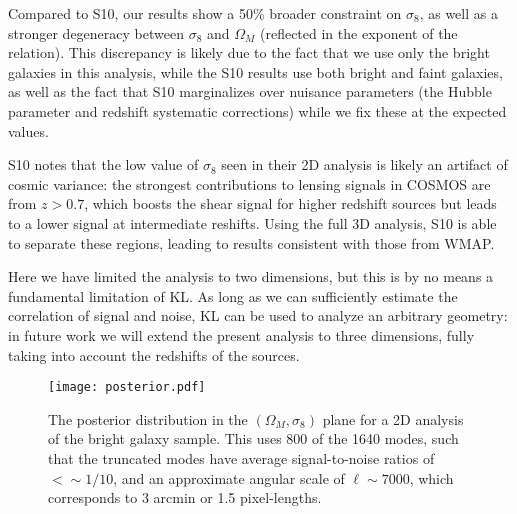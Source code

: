 Compared to S10, our results show a 50\% broader constraint on $\sigma_8$,
as well as a stronger degeneracy between $\sigma_8$ and $\Omega_M$ 
(reflected in the exponent of the relation).  This discrepancy is likely
due to the fact that we use only the bright galaxies in this analysis,
while the S10 results use both bright and faint galaxies, as well as the
fact that S10 marginalizes over nuisance parameters (the Hubble parameter
and redshift systematic corrections) while we fix these at the  expected
values.

S10 notes that the low value of $\sigma_8$ seen in their 2D analysis is likely
an artifact of cosmic variance: the strongest contributions to lensing
signals in COSMOS are from $z > 0.7$, which boosts the shear signal for higher
redshift sources but leads to a lower signal at intermediate reshifts.
Using the full 3D analysis, S10 is able to separate these regions, leading
to results consistent with those from WMAP.

Here we have limited the analysis to two dimensions, but this is by no means a
fundamental limitation of KL.  As long as we can sufficiently estimate the
correlation of signal and noise, KL can be used to analyze an arbitrary
geometry: in future work we will extend the present analysis to three
dimensions, fully taking into account the redshifts of the sources.

\begin{figure*}
 \centering
 \texttt{[image: posterior.pdf]}
 \caption{The posterior distribution in the $(\Omega_M, \sigma_8)$ plane
   for a 2D analysis of the bright galaxy sample.  This uses 800 of the
   1640 modes, such that the truncated modes have average signal-to-noise
   ratios of $<\sim 1/10$, and an approximate angular scale of
   $\ell \sim 7000$, which corresponds to 3 arcmin or 1.5 pixel-lengths.}
 \label{fig:posterior}
\end{figure*}

